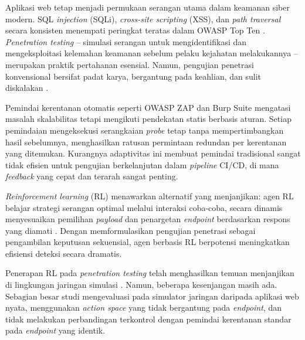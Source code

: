 \documentclass[a4paper,12pt]{article}
\begin{document}
Aplikasi web tetap menjadi permukaan serangan utama dalam keamanan siber modern. SQL \textit{injection} (SQLi), \textit{cross-site scripting} (XSS), dan \textit{path traversal} secara konsisten menempati peringkat teratas dalam OWASP Top Ten \cite{owasp2021}. \textit{Penetration testing} -- simulasi serangan untuk mengidentifikasi dan mengeksploitasi kelemahan keamanan sebelum pelaku kejahatan melakukannya -- merupakan praktik pertahanan esensial. Namun, pengujian penetrasi konvensional bersifat padat karya, bergantung pada keahlian, dan sulit diskalakan \cite{holm2017}.

Pemindai kerentanan otomatis seperti OWASP ZAP \cite{zap2024} dan Burp Suite \cite{burpsuite} mengatasi masalah skalabilitas tetapi mengikuti pendekatan statis berbasis aturan. Setiap pemindaian mengeksekusi serangkaian \textit{probe} tetap tanpa mempertimbangkan hasil sebelumnya, menghasilkan ratusan permintaan redundan per kerentanan yang ditemukan. Kurangnya adaptivitas ini membuat pemindai tradisional sangat tidak efisien untuk pengujian berkelanjutan dalam \textit{pipeline} CI/CD, di mana \textit{feedback} yang cepat dan terarah sangat penting.

\textit{Reinforcement learning} (RL) menawarkan alternatif yang menjanjikan: agen RL belajar strategi serangan optimal melalui interaksi coba-coba, secara dinamis menyesuaikan pemilihan \textit{payload} dan penargetan \textit{endpoint} berdasarkan respons yang diamati \cite{erdodi2022,zhou2021autonomous}. Dengan memformulasikan pengujian penetrasi sebagai pengambilan keputusan sekuensial, agen berbasis RL berpotensi meningkatkan efisiensi deteksi secara dramatis.

Penerapan RL pada \textit{penetration testing} telah menghasilkan temuan menjanjikan di lingkungan jaringan simulasi \cite{becker2024,ghanem2020,venturi2024}. Namun, beberapa kesenjangan masih ada. Sebagian besar studi mengevaluasi pada simulator jaringan daripada aplikasi web nyata, menggunakan \textit{action space} yang tidak bergantung pada \textit{endpoint}, dan tidak melakukan perbandingan terkontrol dengan pemindai kerentanan standar pada \textit{endpoint} yang identik.
\end{document}
